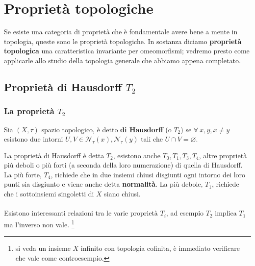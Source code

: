 \chapter{Proprietà topologiche}
Se esiste una categoria di proprietà che è fondamentale avere bene a mente in topologia, queste sono le proprietà topologiche. 
In sostanza diciamo \textbf{proprietà topologica} una caratteristica invariante per omeomorfismi; vedremo presto come applicarle allo studio della topologia generale che abbiamo appena completato.



\section{Proprietà di Hausdorff $T_2$}
\subsection{\textcolor{TopGener}{\textbf{La proprietà $T_2$}}}
 
 
 
\begin{definition}
	Sia $(X, \tau)$ spazio topologico, è detto \textbf{di Hausdorff} (o $T_2$) se $\forall \ x, y, x \neq y$ esistono due intorni $U, V \in \mathcal{N}_\tau(x),\mathcal{N}_\tau(y)$ tali che $U \cap V = \varnothing$.
\end{definition} 


La proprietà di Hausdorff è detta $T_2$,  esistono anche $T_0, T_1, T_3, T_4$, altre proprietà più deboli o più forti (a seconda della loro numerazione) di quella di Hausdorff. \\ La più forte, $T_4$, richiede che in due insiemi chiusi disgiunti ogni intorno dei loro punti sia disgiunto e viene anche detta \textbf{normalità}. La più debole, $T_1$, richiede che i sottoinsiemi singoletti di $X$ siano chiusi.\\ \\ Esistono interessanti relazioni tra le varie proprietà $T_i$, ad esempio $T_2$ implica $T_1$ ma l'inverso non vale. \footnote{si veda un insieme $X$ infinito con topologia cofinita, è immediato verificare che vale come controesempio.}

